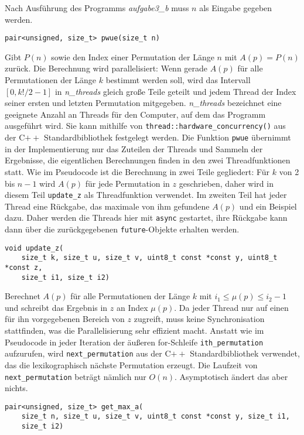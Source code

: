 \documentclass[a4paper, 10pt, ngerman]{article}
\begin{document}
Nach Ausführung des Programms \emph{aufgabe3\_b} muss $n$ als Eingabe gegeben werden.
\bigskip

\noindent \verb|pair<unsigned, size_t> pwue(size_t n)|
\smallskip

\noindent Gibt $P(n)$ sowie den Index einer Permutation der Länge $n$ mit $A(p) = P(n)$ zurück. Die Berechnung wird parallelisiert: Wenn gerade $A(p)$ für alle Permutationen der Länge $k$ bestimmt werden soll, wird das Intervall $[0, k!/2 - 1]$ in \emph{n\_threads} gleich große Teile geteilt und jedem Thread der Index seiner ersten und letzten Permutation mitgegeben. \emph{n\_threads} bezeichnet eine geeignete Anzahl an Threads für den Computer, auf dem das Programm ausgeführt wird. Sie kann mithilfe von \verb|thread::hardware_concurrency()| aus der C$++$ Standardbibliothek festgelegt werden. Die Funktion \verb|pwue| übernimmt in der Implementierung nur das Zuteilen der Threads und Sammeln der Ergebnisse, die eigentlichen Berechnungen finden in den zwei Threadfunktionen statt. Wie im Pseudocode ist die Berechnung in zwei Teile gegliedert: Für $k$ von 2 bis $n - 1$ wird $A(p)$ für jede Permutation in $z$ geschrieben, daher wird in diesem Teil \verb|update_z| als Threadfunktion verwendet. Im zweiten Teil hat jeder Thread eine Rückgabe, das maximale von ihm gefundene $A(p)$ und ein Beispiel dazu. Daher werden die Threads hier mit \verb|async| gestartet, ihre Rückgabe kann dann über die zurückgegebenen \verb|future|-Objekte erhalten werden.
\bigskip

\noindent \verb|void update_z(| \\
\verb|    size_t k, size_t u, size_t v, uint8_t const *const y, uint8_t *const z,| \\
\verb|    size_t i1, size_t i2)|
\smallskip

\noindent Berechnet $A(p)$ für alle Permutationen der Länge $k$ mit $i_1 \le \mu(p) \le i_2 - 1$ und schreibt das Ergebnis in $z$ an Index $\mu(p)$. Da jeder Thread nur auf einen für ihn vorgegebenen Bereich von $z$ zugreift, muss keine Synchronisation stattfinden, was die Parallelisierung sehr effizient macht. Anstatt wie im Pseudocode in jeder Iteration der äußeren for-Schleife \verb|ith_permutation| aufzurufen, wird \verb|next_permutation| aus der C$++$ Standardbibliothek verwendet, das die lexikographisch nächste Permutation erzeugt. Die Laufzeit von \verb|next_permutation| beträgt nämlich nur $O(n)$. Asymptotisch ändert das aber nichts.
\bigskip

\noindent \verb|pair<unsigned, size_t> get_max_a(| \\
\verb|    size_t n, size_t u, size_t v, uint8_t const *const y, size_t i1,| \\
\verb|    size_t i2)|
\smallskip
\end{document}
